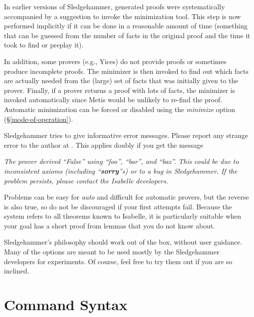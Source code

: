 \documentclass[a4paper,12pt]{article}
\begin{document}
In earlier versions of Sledgehammer, generated proofs were systematically
accompanied by a suggestion to invoke the minimization tool. This step is now
performed implicitly if it can be done in a reasonable amount of time (something
that can be guessed from the number of facts in the original proof and the time
it took to find or preplay it).

In addition, some provers (e.g., Yices) do not provide proofs or sometimes
produce incomplete proofs. The minimizer is then invoked to find out which facts
are actually needed from the (large) set of facts that was initially given to
the prover. Finally, if a prover returns a proof with lots of facts, the
minimizer is invoked automatically since Metis would be unlikely to re-find the
proof.
%
Automatic minimization can be forced or disabled using the \textit{minimize}
option (\S\ref{mode-of-operation}).


Sledgehammer tries to give informative error messages. Please report any strange
error to the author at \authoremail. This applies doubly if you get the message

\prew
\slshape
The prover derived ``\textit{False}'' using ``\textit{foo\/}'',
``\textit{bar\/}'', and ``\textit{baz\/}''.
This could be due to inconsistent axioms (including ``\textbf{sorry}''s) or to
a bug in Sledgehammer. If the problem persists, please contact the
Isabelle developers.
\postw


Problems can be easy for \textit{auto} and difficult for automatic provers, but
the reverse is also true, so do not be discouraged if your first attempts fail.
Because the system refers to all theorems known to Isabelle, it is particularly
suitable when your goal has a short proof from lemmas that you do not know
about.


Sledgehammer's philosophy should work out of the box, without user guidance.
Many of the options are meant to be used mostly by the Sledgehammer developers
for experiments. Of course, feel free to try them out if you are so inclined.

\section{Command Syntax}
\label{command-syntax}
\end{document}
